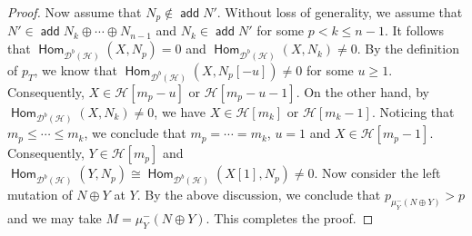 \documentclass[10pt,a4paper]{amsart}
\newcommand{\Hom}{\opname{Hom}}
\newcommand{\add}{\opname{add}\nolimits}
\newcommand{\cd}{{\mathcal D}}
\newcommand{\der}{\cd}
\newcommand{\opname}[1]{\operatorname{\mathsf{#1}}}
\begin{document}
\begin{proof}
Now assume that $N_p\not\in \add N'$. Without loss of generality, we assume that $N'\in \add N_k\oplus\cdots\oplus N_{n-1}$ and $N_k\in \add N'$ for some $p<k\leq n-1$. It follows that $\Hom_{\der^b(\mathcal{H})}(X,N_p)=0$ and $\Hom_{\der^b(\mathcal{H})}(X,N_k)\neq 0$.  By the definition of $p_T$, we know that $\Hom_{\der^b(\mathcal{H})}(X,N_p[-u])\neq 0$ for some $u\geq 1$. Consequently, $X\in \mathcal{H}[m_p-u]$ or $\mathcal{H}[m_p-u-1]$. On the other hand, by $\Hom_{\der^b(\mathcal{H})}(X,N_k)\neq 0$, we have $X\in \mathcal{H}[m_k]$ or $\mathcal{H}[m_k-1]$. Noticing that $m_p\leq \cdots\leq m_k$, we conclude that $m_p=\cdots=m_k$, $u=1$ and $X\in \mathcal{H}[m_p-1]$. Consequently, $Y\in \mathcal{H}[m_p]$ and $\Hom_{\der^b(\mathcal{H})}(Y,N_p)\cong \Hom_{\der^b(\mathcal{H})}(X[1],N_p)\neq 0$. Now consider the left mutation  of $N\oplus Y$ at $Y$. By the above discussion, we conclude that $p_{\mu_Y^-(N\oplus Y)}>p$ and we may take $M=\mu_Y^-(N\oplus Y)$. This completes the proof.
\end{proof}
\end{document}
